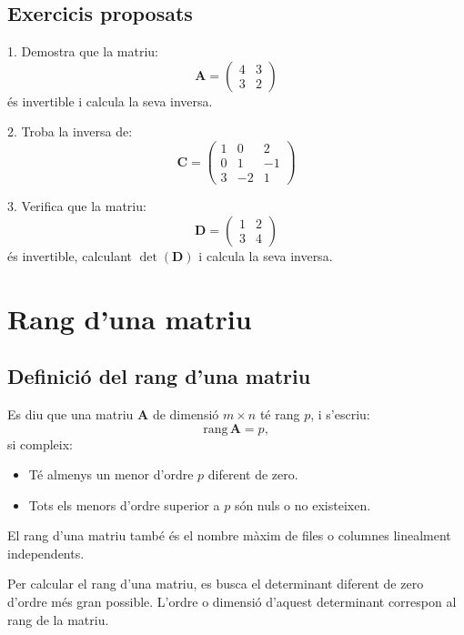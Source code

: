 \documentclass[12pt]{article}
\newcommand{\mat}[1]{\mathbf{#1}}
\begin{document}
\subsection*{Exercicis proposats}
\begin{exercici}
1. Demostra que la matriu:
\[
\mat{A} = \begin{pmatrix}
4 & 3 \\
3 & 2
\end{pmatrix}
\]
és invertible i calcula la seva inversa.

2. Troba la inversa de:
\[
\mat{C} = \begin{pmatrix}
1 & 0 & 2 \\
0 & 1 & -1 \\
3 & -2 & 1
\end{pmatrix}
\]

3. Verifica que la matriu:
\[
\mat{D} = \begin{pmatrix}
1 & 2 \\
3 & 4
\end{pmatrix}
\]
és invertible, calculant $\det(\mat{D})$ i calcula la seva inversa.
\end{exercici}

\newpage

\section{Rang d'una matriu}

\subsection{Definició del rang d'una matriu}
\begin{concept}
Es diu que una matriu $\mat{A}$ de dimensió $m \times n$ té rang $p$, i s'escriu:
\[
\mathrm{rang}\,\mat{A} = p,
\]
si compleix:
\begin{itemize}
    \item Té almenys un menor d'ordre $p$ diferent de zero.
    \item Tots els menors d'ordre superior a $p$ són nuls o no existeixen.
\end{itemize}

El rang d'una matriu també és el nombre màxim de files o columnes linealment independents.
\end{concept}

\begin{concept}
Per calcular el rang d'una matriu, es busca el determinant diferent de zero d'ordre més gran possible. L'ordre o dimensió d'aquest determinant correspon al rang de la matriu.
\end{concept}
\end{document}
